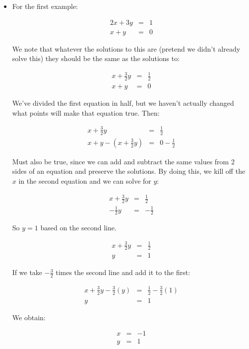 \documentclass[10pt]{article}
\theoremstyle{definition}
\begin{document}
\begin{itemize}
\item For the first example:

\begin{eqnarray*}
2x+3y&=&1\\
x+y&=&0
\end{eqnarray*}

We note that whatever the solutions to this are (pretend we didn't already solve this) they should be the same as the solutions to:

\begin{eqnarray*}
x+\frac{3}{2}y&=&\frac{1}{2}\\
x+y&=&0
\end{eqnarray*}

We've divided the first equation in half, but we haven't actually changed what points will make that equation true.  Then:

\begin{eqnarray*}
x+\frac{3}{2}y&=&\frac{1}{2}\\
x+y-(x+\frac{3}{2}y)&=&0-\frac{1}{2}
\end{eqnarray*}

Must also be true, since we can add and subtract the same values from 2 sides of an equation and preserve the solutions.  By doing this, we kill off the $x$ in the second equation and we can solve for $y$:

\begin{eqnarray*}
x+\frac{3}{2}y&=&\frac{1}{2}\\
-\frac{1}{2}y&=&-\frac{1}{2}
\end{eqnarray*}

So $y=1$ based on the second line.  

\begin{eqnarray*}
x+\frac{3}{2}y&=&\frac{1}{2}\\
y&=&1
\end{eqnarray*}


If we take $-\frac{3}{2}$ times the second line and add it to the first:

\begin{eqnarray*}
x+\frac{3}{2}y-\frac{3}{2}(y)&=&\frac{1}{2}-\frac{3}{2}(1)\\
y&=&1
\end{eqnarray*}

We obtain:

\begin{eqnarray*}
x&=&-1\\
y&=&1
\end{eqnarray*}


\end{itemize}
\end{document}
